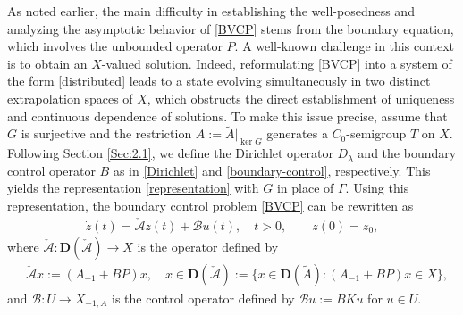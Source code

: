 \documentclass[onecolumn]{autart}
\def\calB{{\mathcal{B}}}
\def\calA{{\mathcal{A}}}
\numberwithin{equation}{section}
\begin{document}
     As noted earlier, the main difficulty in establishing the well-posedness and analyzing the asymptotic behavior of \eqref{BVCP} stems from the boundary equation, which involves the unbounded operator $P$. A well-known challenge in this context is to obtain an $X$-valued solution. Indeed, reformulating \eqref{BVCP} into a system of the form \eqref{distributed} leads to a state evolving simultaneously in two distinct extrapolation spaces of $X$, which obstructs the direct establishment of uniqueness and continuous dependence of solutions. To make this issue precise, assume that $G$ is surjective and the restriction $A:=\tilde{A}\vert_{\ker G}$ generates a $C_0$-semigroup $T$ on $X$. Following Section \ref{Sec:2.1}, we define the Dirichlet operator $D_\lambda$ and the boundary control operator $B$ as in \eqref{Dirichlet} and \eqref{boundary-control}, respectively. This yields the representation \eqref{representation} with $G$ in place of $\Gamma$. Using this representation, the boundary control problem \eqref{BVCP} can be rewritten as %
	\begin{align}\label{BVCP-distributed}
		\dot{z}(t) = \check{\calA} z(t) + \calB u(t), \quad t > 0, \qquad z(0)={z_0},
	\end{align}
	where $\check{\calA} : {\bm D}(\check{\calA}) \to X$ is the operator defined by
	\begin{align}\label{Def.checkA}
		&\check{\calA} x := (A_{-1} + B P)x, \quad
		x \in {\bm D}(\check{\calA}) :=  \{x \in {\bm D}(\tilde{A}) : (A_{-1} + B P)x \in X \},
	\end{align}
	and $\mathcal{B} : U \to X_{-1,A}$ is the control operator defined by $\mathcal{B}u := B K u$ for $u \in U$.
	
\end{document}
